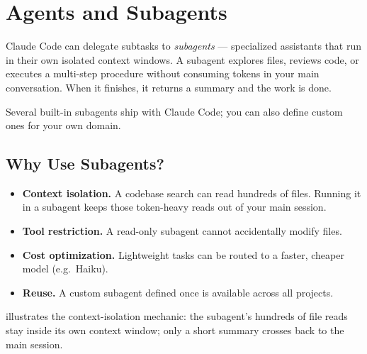 \chapter{Agents and Subagents}
\label{ch:agents}


Claude Code can delegate subtasks to \emph{subagents} — specialized assistants
that run in their own isolated context windows. A subagent explores files,
reviews code, or executes a multi-step procedure without consuming tokens in
your main conversation. When it finishes, it returns a summary and the work is
done.

Several built-in subagents ship with Claude Code; you can also define custom
ones for your own domain.

\section{Why Use Subagents?}
\label{sec:agent-why}

\begin{itemize}
  \item \textbf{Context isolation.} A codebase search can read hundreds of
        files. Running it in a subagent keeps those token-heavy reads out of
        your main session.
  \item \textbf{Tool restriction.} A read-only subagent cannot accidentally
        modify files.
  \item \textbf{Cost optimization.} Lightweight tasks can be routed to a
        faster, cheaper model (e.g.\ Haiku).
  \item \textbf{Reuse.} A custom subagent defined once is available across
        all projects.
\end{itemize}

 illustrates the context-isolation
mechanic: the subagent's hundreds of file reads stay inside its own
context window; only a short summary crosses back to the main session.

